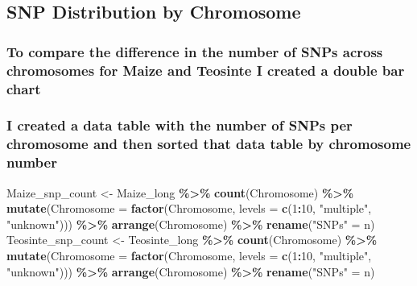 \documentclass[
]{article}
\newenvironment{Shaded}{\begin{snugshade}}{\end{snugshade}}
\newcommand{\AttributeTok}[1]{\textcolor[rgb]{0.13,0.29,0.53}{#1}}
\newcommand{\DecValTok}[1]{\textcolor[rgb]{0.00,0.00,0.81}{#1}}
\newcommand{\FunctionTok}[1]{\textcolor[rgb]{0.13,0.29,0.53}{\textbf{#1}}}
\newcommand{\NormalTok}[1]{#1}
\newcommand{\OtherTok}[1]{\textcolor[rgb]{0.56,0.35,0.01}{#1}}
\newcommand{\SpecialCharTok}[1]{\textcolor[rgb]{0.81,0.36,0.00}{\textbf{#1}}}
\newcommand{\StringTok}[1]{\textcolor[rgb]{0.31,0.60,0.02}{#1}}
\begin{document}
\subsection{SNP Distribution by
Chromosome}\label{snp-distribution-by-chromosome}

\subsubsection{To compare the difference in the number of SNPs across
chromosomes for Maize and Teosinte I created a double bar
chart}\label{to-compare-the-difference-in-the-number-of-snps-across-chromosomes-for-maize-and-teosinte-i-created-a-double-bar-chart}

\subsubsection{I created a data table with the number of SNPs per
chromosome and then sorted that data table by chromosome
number}\label{i-created-a-data-table-with-the-number-of-snps-per-chromosome-and-then-sorted-that-data-table-by-chromosome-number}

\begin{Shaded}
\begin{Highlighting}[]
\NormalTok{Maize\_snp\_count }\OtherTok{\textless{}{-}}\NormalTok{ Maize\_long }\SpecialCharTok{\%\textgreater{}\%} \FunctionTok{count}\NormalTok{(Chromosome) }\SpecialCharTok{\%\textgreater{}\%} 
  \FunctionTok{mutate}\NormalTok{(}\AttributeTok{Chromosome =} \FunctionTok{factor}\NormalTok{(Chromosome, }\AttributeTok{levels =} \FunctionTok{c}\NormalTok{(}\DecValTok{1}\SpecialCharTok{:}\DecValTok{10}\NormalTok{, }\StringTok{"multiple"}\NormalTok{, }\StringTok{"unknown"}\NormalTok{))) }\SpecialCharTok{\%\textgreater{}\%} 
  \FunctionTok{arrange}\NormalTok{(Chromosome) }\SpecialCharTok{\%\textgreater{}\%} \FunctionTok{rename}\NormalTok{(}\StringTok{"SNPs"} \OtherTok{=}\NormalTok{ n)}
\NormalTok{Teosinte\_snp\_count }\OtherTok{\textless{}{-}}\NormalTok{ Teosinte\_long }\SpecialCharTok{\%\textgreater{}\%} \FunctionTok{count}\NormalTok{(Chromosome) }\SpecialCharTok{\%\textgreater{}\%} 
  \FunctionTok{mutate}\NormalTok{(}\AttributeTok{Chromosome =} \FunctionTok{factor}\NormalTok{(Chromosome, }\AttributeTok{levels =} \FunctionTok{c}\NormalTok{(}\DecValTok{1}\SpecialCharTok{:}\DecValTok{10}\NormalTok{, }\StringTok{"multiple"}\NormalTok{, }\StringTok{"unknown"}\NormalTok{))) }\SpecialCharTok{\%\textgreater{}\%} 
  \FunctionTok{arrange}\NormalTok{(Chromosome) }\SpecialCharTok{\%\textgreater{}\%} \FunctionTok{rename}\NormalTok{(}\StringTok{"SNPs"} \OtherTok{=}\NormalTok{ n)}
\end{Highlighting}
\end{Shaded}
\end{document}
